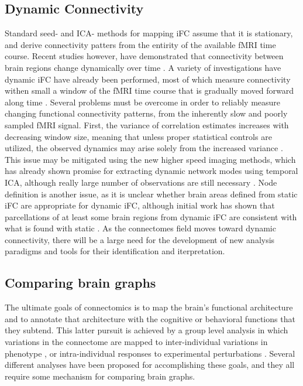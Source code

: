 \subsection{Dynamic Connectivity}

Standard seed- and ICA- methods for mapping iFC assume that it is stationary,
and derive connectivity patters from the entirity of the available fMRI time
course. Recent studies however, have demonstrated that connectivity between
brain regions change dynamically over time \cite{Chang, Keilholz,
Hutchinson2013, Fu2013}. A variety of investigations have dynamic iFC have
already been performed, most of which measure connectivity withen small a
window of the fMRI time course that is gradually moved forward along time
\cite{}. Several problems must be overcome in order to reliably measure
changing functional connectivity patterns, from the inherently slow and poorly
sampled fMRI signal. First, the variance of correlation estimates increases
with decreasing window size, meaning that unless proper statistical controls
are utilized, the observed dynamics may arise solely from the increased
variance \cite{}. This issue may be mitigated using the new higher speed
imaging methods, which has already shown promise for extracting dynamic network
modes using temporal ICA, although really large number of observations are
still necessary \cite{Smith2012}. Node definition is another
issue, as it is unclear whether brain areas defined from static iFC are
appropriate for dynamic iFC, although initial work has shown that parcellations
of at least some brain regions from dynamic iFC are consistent with what is
found with static \cite{Yang2013}. As the connectomes field moves toward
dynamic connectivity, there will be a large need for the development of new
analysis paradigms and tools for their identification and iterpretation. 

\subsection{Comparing brain graphs} 

The ultimate goals of connectomics is to map the brain's functional
architecture and to annotate that architecture with the cognitive or behavioral
functions that they subtend. This latter pursuit is achieved by a group level
analysis in which variations in the connectome are mapped to inter-individual
variations in phenotype \cite{Kelly2011}, or intra-individual responses to
experimental perturbations \cite{Shirer}. Several different analyses have been
proposed for accomplishing these goals, and they all require some mechanism for
comparing brain graphs. 
 
